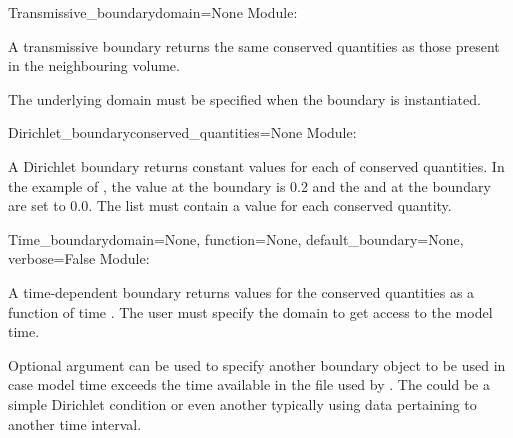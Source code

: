 \documentclass{manual}
\begin{document}
\begin{classdesc}{Transmissive_boundary}{domain=None}
  \label{pg: transmissive boundary}
Module: 

A transmissive boundary returns the same conserved quantities as
those present in the neighbouring volume.

The underlying domain must be specified when the boundary is instantiated.
\end{classdesc}

\begin{classdesc}{Dirichlet_boundary}{conserved_quantities=None}
Module: 

A Dirichlet boundary returns constant values for each of conserved
quantities. In the example of ,
the  value at the boundary is 0.2 and the  and
 at the boundary are set to 0.0. The list must contain
a value for each conserved quantity.
\end{classdesc}

\begin{classdesc}{Time_boundary}{domain=None,
                                 function=None,
                                 default_boundary=None,
                                 verbose=False}
Module: 

A time-dependent boundary returns values for the conserved
quantities as a function of time . The user must specify
the domain to get access to the model time.

Optional argument  can be used to specify another boundary object
to be used in case model time exceeds the time available in the file used by .
The  could be a simple Dirichlet condition or
even another  typically using data pertaining to another time interval.
\end{classdesc}
\end{document}
